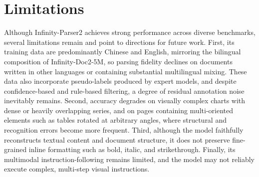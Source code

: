 \section{Limitations}

Although Infinity-Parser2 achieves strong performance across diverse benchmarks, several limitations remain and point to directions for future work. First, its training data are predominantly Chinese and English, mirroring the bilingual composition of Infinity-Doc2-5M, so parsing fidelity declines on documents written in other languages or containing substantial multilingual mixing. These data also incorporate pseudo-labels produced by expert models, and despite confidence-based and rule-based filtering, a degree of residual annotation noise inevitably remains. Second, accuracy degrades on visually complex charts with dense or heavily overlapping series, and on pages containing multi-oriented elements such as tables rotated at arbitrary angles, where structural and recognition errors become more frequent. Third, although the model faithfully reconstructs textual content and document structure, it does not preserve fine-grained inline formatting such as bold, italic, and strikethrough. Finally, its multimodal instruction-following remains limited, and the model may not reliably execute complex, multi-step visual instructions.
